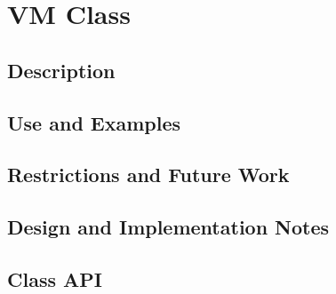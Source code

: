 \documentclass[english]{article}
\begin{document}
\section{VM Class}
\subsection{Description}

%
%
\subsection{Use and Examples}











\subsection{Restrictions and Future Work}

\subsection{Design and Implementation Notes}

\subsection{Class API}

%
%
%
\end{document}
